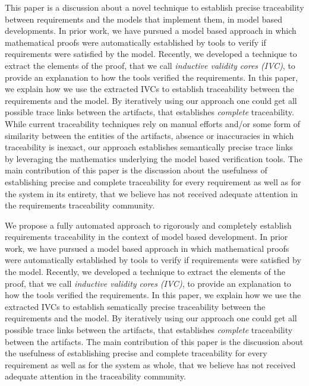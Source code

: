 This paper is a discussion about a novel technique to establish precise traceability between requirements and the models that implement them, in model based developments. In prior work, we have pursued a model based approach in which mathematical proofs were automatically established by tools to verify if requirements were satisfied by the model. Recently, we developed a technique to extract the elements of the proof, that we call {\em inductive validity cores (IVC)}, to provide an explanation to how the tools verified the requirements. In this paper, we explain how we use the extracted IVCs to establish traceability between the requirements and the model. By iteratively using our approach one could get all possible trace links between the artifacts, that establishes \emph{complete} traceability. While current traceability techniques rely on manual efforts and/or some form of similarity between the entities of the artifacts, absence or inaccuracies in which traceability is inexact, our approach establishes semantically precise trace links by leveraging the mathematics underlying the model based verification tools. The main contribution of this paper is the discussion about the usefulness of establishing precise and complete traceability for every requirement as well as for the system in its entirety, that we believe has not received adequate attention in the requirements traceability community.




We propose a fully automated approach to rigorously and completely establish requirements traceability in the context of model based development. In prior work, we have pursued a model based approach in which mathematical proofs were automatically established by tools to verify if requirements were satisfied by the model. Recently, we developed a technique to extract the elements of the proof, that we call {\em inductive validity cores (IVC)}, to provide an explanation to how the tools verified the requirements. In this paper, we explain how we use the extracted IVCs to establish sematically precise traceability between the requirements and the model. By iteratively using our approach one could get all possible trace links between the artifacts, that establishes \emph{complete} traceability between the artifacts. The main contribution of this paper is the discussion about the usefulness of establishing precise and complete traceability for every requirement as well as for the system as whole, that we believe has not received adequate attention in the traceability community.

